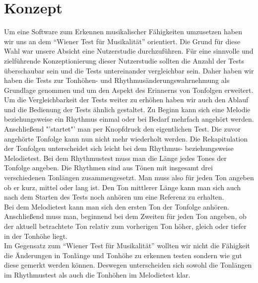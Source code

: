 \documentclass{acm_proc_article-sp}
\begin{document}
\section{Konzept}
Um eine Software zum Erkennen musikalischer Fähigkeiten umzusetzen haben wir uns an dem "`Wiener Test für Musikalität"' orientiert.
Die Grund für diese Wahl war unsere Absicht eine Nutzerstudie durchzuführen. Für eine sinnvolle und zielführende Konzeptionierung dieser Nutzerstudie sollten die Anzahl der Tests überschaubar sein und die Tests untereinander vergleichbar sein.
Daher haben wir haben die Tests zur Tonhöhen- und Rhythmusänderungswahrnehmung als Grundlage genommen und um den Aspekt des Erinnerns von Tonfolgen erweitert.
Um die Vergleichbarkeit der Tests weiter zu erhöhen haben wir auch den Ablauf und die Bedienung der Tests ähnlich gestaltet.
Zu Beginn kann sich eine Melodie beziehungsweise ein Rhythmus einmal oder bei Bedarf mehrfach angehört werden. Anschließend "'startet"' man per Knopfdruck den eigentlichen Test. Die zuvor angehörte Tonfolge kann nun nicht mehr wiederholt werden. Die Rekapitulation der Tonfolgen unterscheidet sich leicht bei dem Rhythmus- beziehungsweise Melodietest. Bei dem Rhythmustest muss man die Länge jedes Tones der Tonfolge angeben. Die Rhythmen sind aus Tönen mit insgesamt drei verschiedenen Tonlängen zusammengesetzt. Man muss also für jeden Ton angeben ob er kurz, mittel oder lang ist. Den Ton mittlerer Länge kann man sich auch nach dem Starten des Tests noch anhören um eine Referenz zu erhalten.\\
Bei dem Melodietest kann man sich den ersten Ton der Tonfolge anhören. Anschließend muss man, beginnend bei dem Zweiten für jeden Ton angeben, ob der aktuell betrachtete Ton relativ zum vorherigen Ton höher, gleich oder tiefer in der Tonhöhe liegt.\\ 
Im Gegensatz zum "`Wiener Test für Musikalität"' wollten wir nicht die Fähigkeit die Änderungen in Tonlänge und Tonhöhe zu erkennen testen sondern wie gut diese gemerkt werden können. Deswegen unterscheiden sich sowohl die Tonlängen im Rhythmustest als auch die Tonhöhen im Melodietest klar.
\end{document}
